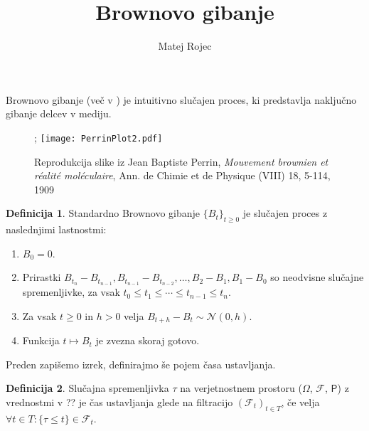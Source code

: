 \documentclass[11pt]{article}
\title{Brownovo gibanje}
\author{Matej Rojec}
\date{}
\newcommand{\f}{\mathcal{F}}
\begin{document}
\maketitle

\theoremstyle{plain}
\newtheorem{izrek}{Izrek}

\theoremstyle{definition}
\newtheorem{definicija}{Definicija}

Brownovo gibanje (več v \cite{karatzas1991brownian}) je intuitivno slučajen proces, %
ki predstavlja naključno gibanje delcev v mediju.
    

\begin{figure}[!ht]
    \centering
    \caption{Reprodukcija slike iz Jean Baptiste Perrin, \emph{Mouvement brownien et réalité moléculaire}, Ann. de Chimie et de Physique (VIII) 18, 5-114, 1909};
    \texttt{[image: PerrinPlot2.pdf]}
\end{figure}

    \begin{definicija}
        Standardno Brownovo gibanje $\{B_t\}_{t \geq 0}$ je slučajen proces z naslednjimi lastnostmi: 
        \begin{enumerate}
            \item $B_0 = 0$.
            \item Prirastki $B_{t_n} - B_{t_{n-1}}, B_{t_{n-1}} - B_{t_{n-2}}, \ldots, B_2 - B_1, B_1 - B_0$ so neodvisne slučajne spremenljivke, za vsak $t_0 \leq t_1 \leq \cdots \leq t_{n-1} \leq t_n$.
            \item Za vsak $t \geq 0$ in $h > 0$ velja $B_{t+h} - B_t \sim \mathcal{N}(0, h)$.
            \item Funkcija $t \mapsto B_t$ je zvezna skoraj gotovo.
        \end{enumerate}
    \end{definicija}
    
    Preden zapišemo izrek, definirajmo še pojem časa ustavljanja.
    
    \begin{definicija}
    Slučajna spremenljivka $\tau$ na verjetnostnem prostoru ($\Omega$, $\f$, $\mathsf{P}$) z vrednostmi v ??
    je čas ustavljanja glede na filtracijo $(\f_t)_{t \in T}$, če velja $\forall t \in T: \{\tau \leq t\} \in \f_t$.
    \end{definicija}
    
\end{document}
